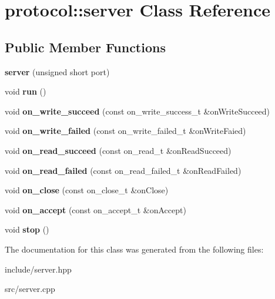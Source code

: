 \hypertarget{classprotocol_1_1server}{}\section{protocol\+:\+:server Class Reference}
\label{classprotocol_1_1server}
\subsection*{Public Member Functions}
\begin{DoxyCompactItemize}
\item 
\mbox{\label{classprotocol_1_1server_a49771c5d0154d3f9a4b8bfe26f3a3ff0}} 
{\bfseries server} (unsigned short port)
\item 
\mbox{\label{classprotocol_1_1server_ae189d865fb7deeac36354d2668efc040}} 
void {\bfseries run} ()
\item 
\mbox{\label{classprotocol_1_1server_a8ec3d2c2f0ad0eccbdc5b1b99c5fd1d6}} 
void {\bfseries on\+\_\+write\+\_\+succeed} (const on\+\_\+write\+\_\+success\+\_\+t \&on\+Write\+Succeed)
\item 
\mbox{\label{classprotocol_1_1server_a54c18485b3b186a9faeed62bde2425c7}} 
void {\bfseries on\+\_\+write\+\_\+failed} (const on\+\_\+write\+\_\+failed\+\_\+t \&on\+Write\+Faied)
\item 
\mbox{\label{classprotocol_1_1server_a4aa82c34eaf46efb54167981c2875b56}} 
void {\bfseries on\+\_\+read\+\_\+succeed} (const on\+\_\+read\+\_\+t \&on\+Read\+Succeed)
\item 
\mbox{\label{classprotocol_1_1server_acbe1c5830f6c7d7e6a61cd2d914733ed}} 
void {\bfseries on\+\_\+read\+\_\+failed} (const on\+\_\+read\+\_\+failed\+\_\+t \&on\+Read\+Failed)
\item 
\mbox{\label{classprotocol_1_1server_a6dfdd8b0c24be4f54e7a5671d4e72d89}} 
void {\bfseries on\+\_\+close} (const on\+\_\+close\+\_\+t \&on\+Close)
\item 
\mbox{\label{classprotocol_1_1server_a0f5936cf17113c4f44a1e8fa6c853951}} 
void {\bfseries on\+\_\+accept} (const on\+\_\+accept\+\_\+t \&on\+Accept)
\item 
\mbox{\label{classprotocol_1_1server_afbb26696c9fef02d992b081e233c26a9}} 
void {\bfseries stop} ()
\end{DoxyCompactItemize}


The documentation for this class was generated from the following files\+:\begin{DoxyCompactItemize}
\item 
include/server.\+hpp\item 
src/server.\+cpp\end{DoxyCompactItemize}
